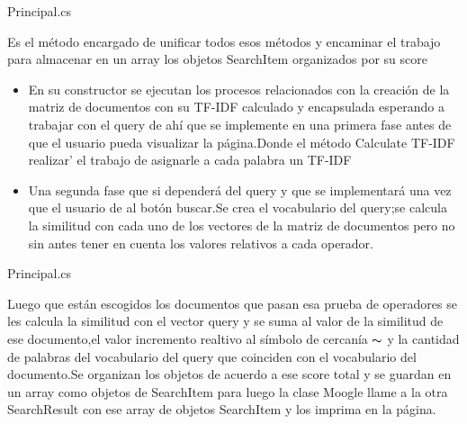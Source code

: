\begin{frame}[fragile]{Principal.cs}
\begin{center}

  Es el método encargado de unificar todos esos  métodos y encaminar el trabajo
  para almacenar en un array los objetos SearchItem organizados por su score
  \begin{itemize}
      \item En su  constructor se ejecutan los procesos relacionados con la creación de la
      matriz de documentos con su TF-IDF calculado y encapsulada esperando a
      trabajar con el query  de ahí que se implemente en una primera fase antes de
      que el usuario pueda visualizar la página.Donde el método Calculate TF-IDF
      realizar\a' el trabajo  de asignarle a cada palabra un TF-IDF
      \item Una segunda fase que si dependerá del query y que se implementará una vez
      que el usuario de al botón buscar.Se crea el vocabulario del query;se  calcula la
      similitud con cada  uno de los vectores de la matriz de documentos pero no sin
      antes tener en  cuenta los valores relativos a cada operador.
      
  \end{itemize}
\end{center}
\end{frame}
\begin{frame}[fragile]{Principal.cs}
  \begin{center}
  Luego que  están  escogidos los documentos que pasan esa prueba de
  operadores se les calcula la similitud con  el vector query y se suma al valor de
  la similitud de ese documento,el valor incremento realtivo al símbolo de
  cercanía $\thicksim$  y la cantidad de palabras del vocabulario del query que coinciden
  con el vocabulario del documento.Se organizan los objetos de acuerdo a ese
  score total y se guardan en un array como objetos de SearchItem para luego la
  clase Moogle llame  a la otra SearchResult con ese array de objetos SearchItem
  y los imprima en la página. 
\end{center}
\end{frame}

